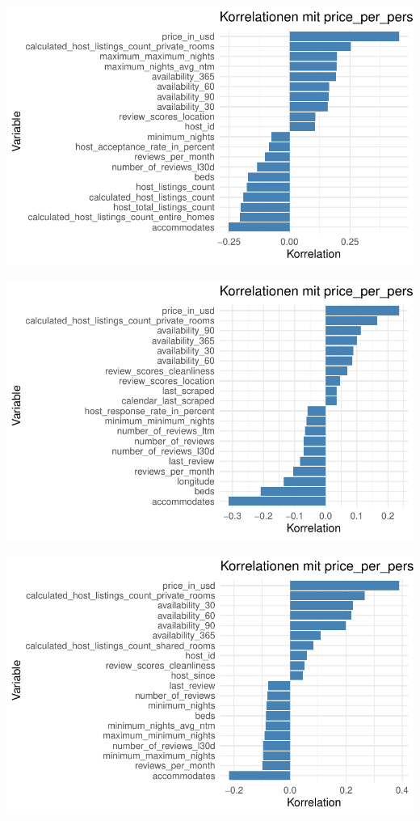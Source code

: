 \documentclass[
  journal,
]{IEEEtran}%
\begin{document}
\includegraphics{main_files/figure-pdf/unnamed-chunk-13-1.pdf}

\includegraphics{main_files/figure-pdf/unnamed-chunk-13-2.pdf}

\includegraphics{main_files/figure-pdf/unnamed-chunk-13-3.pdf}
\end{document}

